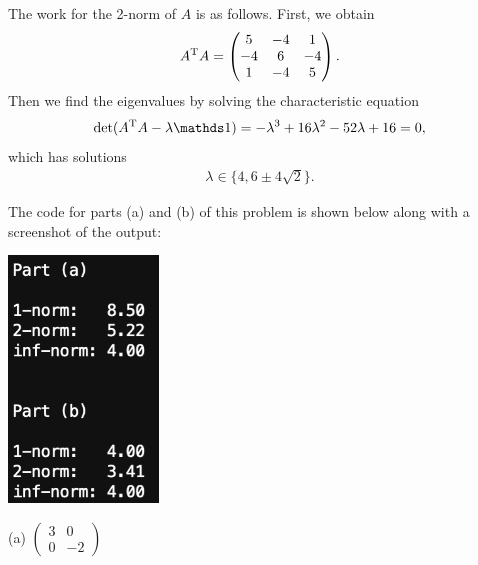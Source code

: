 The work for the 2-norm of $A$ is as follows.
First, we obtain
\begin{eqnarray}
    \label{eq:AT-A}
    A^{\rm T}A = \begin{pmatrix}5 & -4 & 1\\-4 & 6 & -4\\1 & -4 & 5\end{pmatrix}
.\end{eqnarray}
Then we find the eigenvalues by solving the characteristic equation
\begin{eqnarray}
    \label{eq:char-eq}
    {\rm det}(A^{\rm T}A - \lambda\id) = - \lambda^{3} + 16 \lambda^{2} - 52 \lambda + 16 = 0
,\end{eqnarray}
which has solutions
\begin{eqnarray}
    \label{eq:eigvals-ATA}
    \lambda \in \{ 4,6 \pm 4\sqrt{2} \}  
.\end{eqnarray}

The code for parts (a) and (b) of this problem is shown below along with a screenshot of the output:

\begin{center}
\includegraphics[width=0.3\textwidth]{prob5.png} 
\end{center}




(a) $\begin{pmatrix}
    3 & 0 \\
    0 & -2
\end{pmatrix}
$

